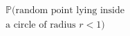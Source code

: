 \documentclass[preview]{standalone}
\begin{document}
\begin{align*}
\mathbb{P} ( \text{random point lying inside}\\ \text{a circle of radius }  r <1 )
\end{align*}
\end{document}
